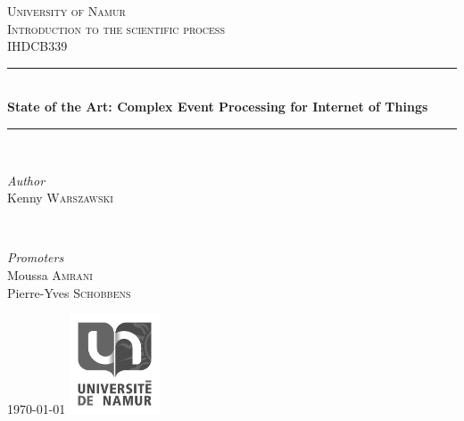 \documentclass[11pt]{article}
\begin{document}
\begin{titlepage}
	\newcommand{\HRule}{\rule{\linewidth}{0.5mm}}
	\center
	\textsc{\LARGE University of Namur}\\[1.5cm]
	\textsc{\Large Introduction to the scientific process}\\[0.5cm]
	\textsc{\large IHDCB339}\\[0.5cm]
	\HRule\\[0.4cm]
	{\huge\bfseries State of the Art: Complex Event Processing for Internet of Things}\\[0.4cm]
	\HRule\\[1.5cm]	
	\begin{minipage}{0.4\textwidth}
		\begin{flushleft}
			\large
			\textit{Author}\\
			Kenny \textsc{Warszawski} 
		\end{flushleft}
	\end{minipage}
	~
	\begin{minipage}{0.4\textwidth}
		\begin{flushright}
			\large
			\textit{Promoters}\\
			Moussa \textsc{Amrani}
			\\
			Pierre-Yves \textsc{Schobbens} 
		\end{flushright}
	\end{minipage}	
	\vfill\vfill\vfill
	{\large\today}
	\vfill\vfill
	\includegraphics[width=0.2\textwidth]{assets/placeholder.png}\\[1cm]
	\vfill
\end{titlepage}
\end{document}

